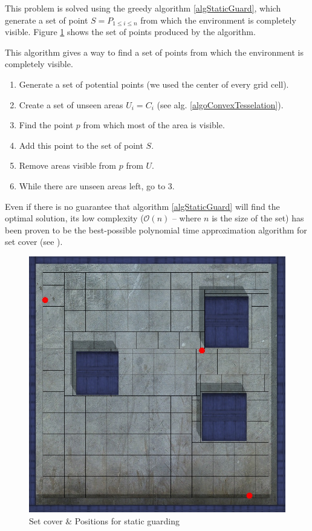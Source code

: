 This problem is solved using the greedy algorithm \ref{algStaticGuard}, which generate a set of point $ S = P_{1\leq i \leq n}$ from which the environment is completely visible. Figure \ref{convexTesselation} shows the set of points produced by the algorithm.

\begin{algorithm}
This algorithm gives a way to find a set of points from which the environment is completely visible.
\begin{enumerate}
	\item Generate a set of potential points (we used the center of every grid cell).
	\item Create a set of unseen areas $U_i = C_i$ (see alg. \ref{algoConvexTesselation}).
	\item Find the point $p$ from which most of the area is visible.
	\item Add this point to the set of point $S$.
	\item Remove areas visible from $p$ from $U$.
	\item While there are unseen areas left, go to 3.
\end{enumerate}
\label{algStaticGuard}
\end{algorithm}

Even if there is no guarantee that algorithm \ref{algStaticGuard} will find the optimal solution, its low complexity ($\mathcal{O}(n)$ -- where $n$ is the size of the set) has been proven to be the best-possible polynomial time approximation algorithm for set cover (see \cite{approxMinProb}).

\begin{figure}[h!t]
	\begin{center}
	\includegraphics[width=\linewidth,natwidth=824,natheight=823]{fig/staticCoverSet.jpg}
	\end{center}
	\caption{Set cover \& Positions for static guarding}
	\label{convexTesselation}
\end{figure}